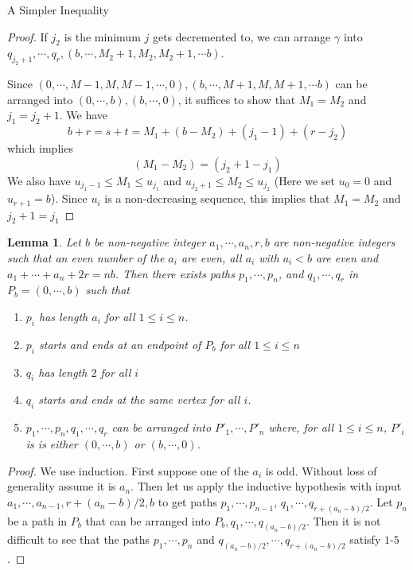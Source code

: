 \documentclass[11pt,a4paper]{article}
\newtheorem{lemma}[subsection]{Lemma}
\begin{document}
\begin{section}{A Simpler Inequality}
\begin{proof}
\medskip

If $j_2$ is the minimum $j$ gets decremented to, we can arrange $\gamma$ into $q_{j_2 + 1}, \cdots, q_r, (b, \cdots, M_2 + 1, M_2, M_2 + 1, \cdots b)$.

\medskip

Since $(0, \cdots,M - 1, M, M - 1, \cdots, 0), (b, \cdots, M + 1, M, M + 1, \cdots b)$ can be arranged into $(0, \cdots, b), (b, \cdots, 0)$, it suffices to show that $M_1 = M_2$ and $j_1 = j_2 + 1$. We have
\[
b + r = s + t = M_1 + (b - M_2) + (j_1 - 1) + (r - j_2)
\]
which implies
\[
(M_1 - M_2) = (j_2 + 1 - j_1)
\]
We also have $u_{j_1 - 1} \leq M_1 \leq u_{j_1}$ and $u_{j_2 + 1} \leq M_2 \leq u_{j_2}$ (Here we set $u_0 = 0$ and $u_{r + 1} = b$). Since $u_i$ is a non-decreasing sequence, this implies that $M_1 = M_2$ and $j_2 + 1 = j_1$
\end{proof}
\begin{lemma} \label{lemma_2} Let $b$ be non-negative integer $a_1, \cdots, a_n, r, b$ are non-negative integers such that an even number of the $a_i$ are even, all $a_i$ with $a_i < b$ are even and $a_1 + \cdots + a_n + 2r = n b$. Then there exists paths $p_1, \cdots, p_n$, and $q_1, \cdots, q_r$ in $P_b = (0, \cdots, b)$ such that
\begin{enumerate}
\item $p_i$ has length $a_i$ for all $1 \leq i \leq n$.
\item $p_i$ starts and ends at an endpoint of $P_b$ for all $1 \leq i \leq n$
\item $q_i$ has length $2$ for all $i$
\item $q_i$ starts and ends at the same vertex for all $i$.
\item $p_1, \cdots, p_n, q_1, \cdots,q_r$ can be arranged into $P'_1, \cdots, P'_n$ where, for all $1 \leq i \leq n$, $P'_i$ is is either $(0,\cdots, b)$ or $(b, \cdots, 0)$.
\end{enumerate}
\end{lemma}
\begin{proof} We use induction. First suppose one of the $a_i$ is odd. Without loss of generality assume it is $a_n$. Then let us apply the inductive hypothesis with input $a_1, \cdots, a_{n - 1}, r + (a_n - b)/2, b$ to get paths $p_1, \cdots, p_{n - 1}$, $q_1, \cdots, q_{r + (a_n - b)/2}$. Let $p_n$ be a path in $P_b$ that can be arranged into $P_b, q_1, \cdots, q_{ (a_n - b)/2}$. Then it is not difficult to see that the paths $p_1, \cdots, p_n$ and $q_{(a_n - b)/2}, \cdots, q_{r + (a_n - b)/2}$ satisfy $1$-$5$.


\end{proof}
\end{section}
\end{document}

